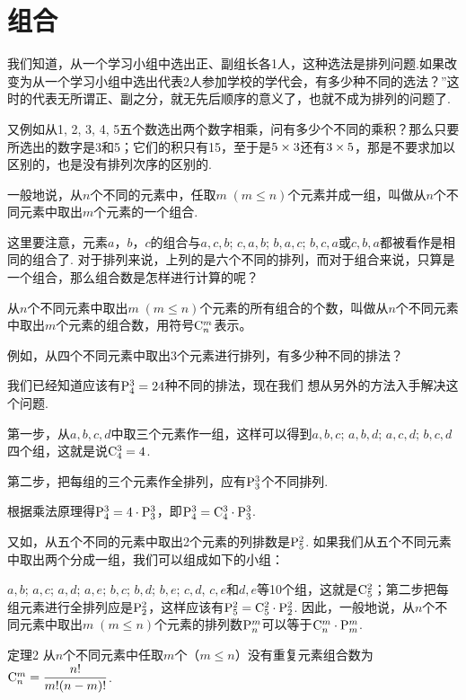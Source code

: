\section{组合}
我们知道，从一个学习小组中选出正、副组长各1人，这种选法是排列问题.如果改变为从一个学习小组中选出代表2人参加学校的学代会，有多少种不同的选法？”这时的代表无所谓正、副之分，就无先后顺序的意义了，也就不成为排列的问题了.

又例如从1, 2, 3, 4, 5五个数选出两个数字相乘，问有多少个不同的乘积？那么只要所选出的数字是3和5；它们的积只有15，至于是$5\times3$还有$3\times5$，那是不要求加以区别的，也是没有排列次序的区别的.

一般地说，从$n$个不同的元素中，任取$m\; (m\le n)$个元素并成一组，叫做从$n$个不同元素中取出$m$个元素的一个组合.

这里要注意，元素$a$，$b$，$c$的组合与$a,c,b$; $c,a,b$; $b,a,c$; $b,c,a$或$c,b,a$都被看作是相同的组合了. 对于排列来说，上列的是六个不同的排列，而对于组合来说，只算是一个组合，那么组合数是怎样进行计算的呢？

从$n$个不同元素中取出$m\; (m\le n)$个元素的所有组合的个数，叫做从$n$个不同元素中取出$m$个元素的组合数，用符号${\rm C}^{m}_{n}$表示。

例如，从四个不同元素中取出3个元素进行排列，有多少种不同的排法？

我们已经知道应该有${\rm P}^{3}_{4}=24$种不同的排法，现在我们
想从另外的方法入手解决这个问题.

第一步，从$a,b,c,d$中取三个元素作一组，这样可以得到$a,b,c$; $a,b,d$; $a,c,d$; $b,c,d$四个组，这就是说${\rm C}^{3}_{4}=4$.

第二步，把每组的三个元素作全排列，应有${\rm P}^{3}_{3}$个不同排列.

根据乘法原理得${\rm P}^{3}_{4}=4\cdot {\rm P}^{3}_{3}$，即${\rm P}^{3}_{4}={\rm C}^{3}_{4}\cdot {\rm P}^{3}_{3}$.

又如，从五个不同的元素中取出2个元素的列排数是${\rm P}^{2}_{5}$. 如果我们从五个不同元素中取出两个分成一组，我们可以组成如下的小组：

$a,b$; $a,c$; $a,d$; $a,e$; $b,c$; $b,d$; $b,e$; $c,d$, $c,e$和$d,e$等10个组，这就是${\rm C}^{2}_{5}$；第二步把每组元素进行全排列应是${\rm P}^{2}_{2}$，这样应该有${\rm P}^{2}_{5}={\rm C}^{2}_{5}\cdot {\rm P}^{2}_{2}$. 因此，一般地说，从$n$个不同元素中取出$m\; (m\le n)$个元素的排列数${\rm P}^{m}_{n}$可以等于${\rm C}^{m}_{n}\cdot {\rm P}^{m}_{m}$.


\begin{blk}
  {定理2} 从$n$个不同元素中任取$m$个（$m\le n$）没有重复元素组合数为${\rm C}^{m}_{n}=\dfrac{n!}{m!(n-m)!}$.  
\end{blk}

